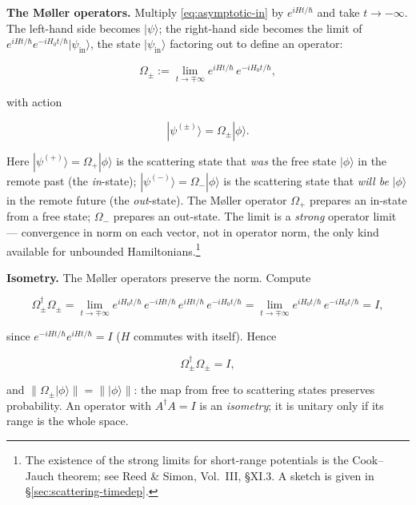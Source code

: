 \medskip\noindent\textbf{The M\o{}ller operators.} Multiply \eqref{eq:asymptotic-in} by $e^{iHt/\hbar}$ and take $t\to-\infty$. The left-hand side becomes $|\psi\rangle$; the right-hand side becomes the limit of $e^{iHt/\hbar}e^{-iH_{0}t/\hbar}|\psi_{\mathrm{in}}\rangle$, the state $|\psi_{\mathrm{in}}\rangle$ factoring out to define an operator:
\begin{linenomath}
\begin{equation}
\Omega_{\pm} := \lim_{t\to\mp\infty} e^{iHt/\hbar}\,e^{-iH_{0}t/\hbar},
\label{eq:moller-operators}
\end{equation}
\end{linenomath}
with action
\begin{linenomath}
\begin{equation}
|\psi^{(\pm)}\rangle = \Omega_{\pm}|\phi\rangle.
\label{eq:moller-action}
\end{equation}
\end{linenomath}
Here $|\psi^{(+)}\rangle=\Omega_{+}|\phi\rangle$ is the scattering state that \emph{was} the free state $|\phi\rangle$ in the remote past (the \emph{in}-state); $|\psi^{(-)}\rangle=\Omega_{-}|\phi\rangle$ is the scattering state that \emph{will be} $|\phi\rangle$ in the remote future (the \emph{out}-state). The M\o{}ller operator $\Omega_{+}$ prepares an in-state from a free state; $\Omega_{-}$ prepares an out-state. The limit is a \emph{strong} operator limit --- convergence in norm on each vector, not in operator norm, the only kind available for unbounded Hamiltonians.\footnote{The existence of the strong limits for short-range potentials is the Cook--Jauch theorem; see Reed \& Simon, Vol.~III, \S XI.3. A sketch is given in \S\ref{sec:scattering-timedep}.}

\medskip\noindent\textbf{Isometry.} The M\o{}ller operators preserve the norm. Compute
\begin{linenomath}
\begin{equation*}
\Omega_{\pm}^{\dagger}\Omega_{\pm}
= \lim_{t\to\mp\infty} e^{iH_{0}t/\hbar}\,e^{-iHt/\hbar}\,e^{iHt/\hbar}\,e^{-iH_{0}t/\hbar}
= \lim_{t\to\mp\infty} e^{iH_{0}t/\hbar}\,e^{-iH_{0}t/\hbar}
= I,
\end{equation*}
\end{linenomath}
since $e^{-iHt/\hbar}e^{iHt/\hbar}=I$ ($H$ commutes with itself). Hence
\begin{linenomath}
\begin{equation}
\Omega_{\pm}^{\dagger}\Omega_{\pm} = I,
\label{eq:moller-isometry}
\end{equation}
\end{linenomath}
and $\|\Omega_{\pm}|\phi\rangle\|=\||\phi\rangle\|$: the map from free to scattering states preserves probability. An operator with $A^{\dagger}A=I$ is an \emph{isometry}; it is unitary only if its range is the whole space.


